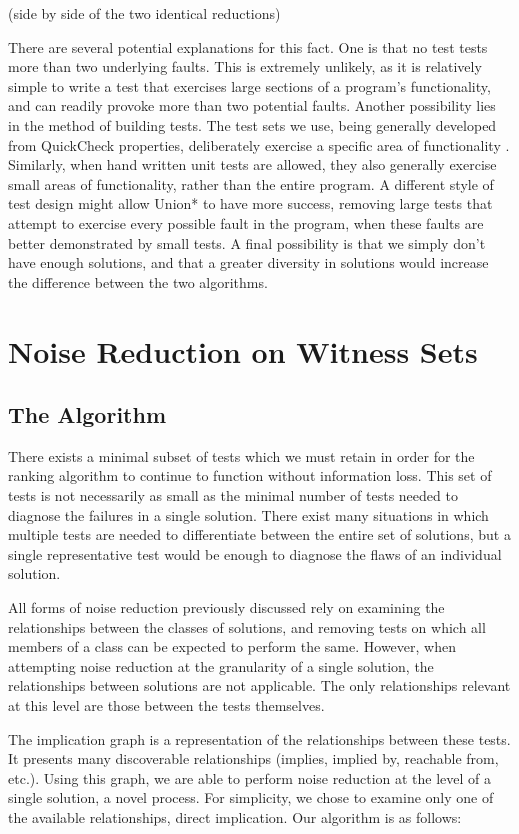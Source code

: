 \documentclass[11pt]{article}
\begin{document}
(side by side of the two identical reductions)

There are several potential explanations for this fact. One is that no test tests more than two underlying faults. This is extremely unlikely, as it is relatively simple to write a test that exercises large sections of a program's functionality, and can readily provoke more than two potential faults. Another possibility lies in the method of building tests. The test sets we use, being generally developed from QuickCheck properties, deliberately exercise a specific area of functionality \cite{QuickCheck}. Similarly, when hand written unit tests are allowed, they also generally exercise small areas of functionality, rather than the entire program. A different style of test design might allow Union* to have more success, removing large tests that attempt to exercise every possible fault in the program, when these faults are better demonstrated by small tests. A final possibility is that we simply don't have enough solutions, and that a greater diversity in solutions would increase the difference between the two algorithms.

\section{Noise Reduction on Witness Sets}
\subsection{The Algorithm}
There exists a minimal subset of tests which we must retain in order for the ranking algorithm to continue to function without information loss. This set of tests is not necessarily as small as the minimal number of tests needed to diagnose the failures in a single solution. There exist many situations in which multiple tests are needed to differentiate between the entire set of solutions, but a single representative test would be enough to diagnose the flaws of an individual solution.

All forms of noise reduction previously discussed rely on examining the relationships between the classes of solutions, and removing tests on which all members of a  class can be expected to perform the same. However, when attempting noise reduction at the granularity of a single solution, the relationships between solutions are not applicable. The only relationships relevant at this level  are those between the tests themselves.

The implication graph is a representation of the relationships between these tests. It presents many discoverable relationships (implies, implied by, reachable from, etc.). Using this graph, we are able to perform noise reduction at the level of a single solution, a novel process. For simplicity, we chose to examine only one of the available relationships, direct implication. Our algorithm is as follows:
\end{document}
